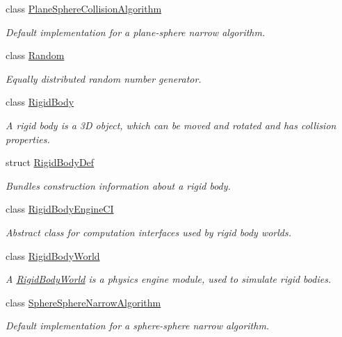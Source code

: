 \begin{DoxyCompactItemize}
class \mbox{\hyperlink{classr3_1_1_plane_sphere_collision_algorithm}{Plane\+Sphere\+Collision\+Algorithm}}
\begin{DoxyCompactList}\small\item\em Default implementation for a plane-\/sphere narrow algorithm. \end{DoxyCompactList}\item 
class \mbox{\hyperlink{classr3_1_1_random}{Random}}
\begin{DoxyCompactList}\small\item\em Equally distributed random number generator. \end{DoxyCompactList}\item 
class \mbox{\hyperlink{classr3_1_1_rigid_body}{Rigid\+Body}}
\begin{DoxyCompactList}\small\item\em A rigid body is a 3D object, which can be moved and rotated and has collision properties. \end{DoxyCompactList}\item 
struct \mbox{\hyperlink{structr3_1_1_rigid_body_def}{Rigid\+Body\+Def}}
\begin{DoxyCompactList}\small\item\em Bundles construction information about a rigid body. \end{DoxyCompactList}\item 
class \mbox{\hyperlink{classr3_1_1_rigid_body_engine_c_i}{Rigid\+Body\+Engine\+CI}}
\begin{DoxyCompactList}\small\item\em Abstract class for computation interfaces used by rigid body worlds. \end{DoxyCompactList}\item 
class \mbox{\hyperlink{classr3_1_1_rigid_body_world}{Rigid\+Body\+World}}
\begin{DoxyCompactList}\small\item\em A \mbox{\hyperlink{classr3_1_1_rigid_body_world}{Rigid\+Body\+World}} is a physics engine module, used to simulate rigid bodies. \end{DoxyCompactList}\item 
class \mbox{\hyperlink{classr3_1_1_sphere_sphere_narrow_algorithm}{Sphere\+Sphere\+Narrow\+Algorithm}}
\begin{DoxyCompactList}\small\item\em Default implementation for a sphere-\/sphere narrow algorithm. \end{DoxyCompactList}\item 

\end{DoxyCompactItemize}
